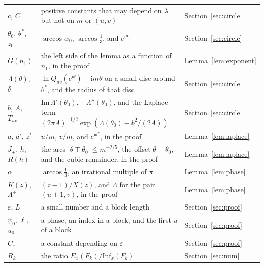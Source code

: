 \documentclass[11pt]{amsart}
\theoremstyle{remark}
\newcommand{\Inf}{\mathrm{Inf}}
\newcommand{\ii}{\mathrm{i}}
\begin{document}
\begin{longtable}{@{}>{\raggedright\arraybackslash}p{}>{\raggedright\arraybackslash}p{}>{\raggedright\arraybackslash}p{}@{}}
$c$, $C$ & positive constants that may depend on $\lambda$ but not on $m$ or $(u,v)$ & Section~\ref{sec:circle} \\
$\theta_0$, $\theta^*$, $z_0$ & $\arccos w_0$, $\arccos\frac13$, and $e^{\ii\theta_0}$ & Section~\ref{sec:circle} \\
$G(n_1)$ & the left side of the lemma as a function of $n_1$, in the proof & Lemma~\ref{lem:exponent} \\
$\Lambda(\theta)$, $\delta$ & $\ln Q_{uv}(e^{\ii\theta})-\ii m\theta$ on a small disc around $\theta^*$, and the radius of that disc & Section~\ref{sec:circle} \\
$b$, $A$, $T_{uv}$ & $\mathrm{Im}\,\Lambda'(\theta_0)$, $-\Lambda''(\theta_0)$, and the Laplace term $(2\pi A)^{-1/2}\exp(\Lambda(\theta_0)-b^2/(2A))$ & Section~\ref{sec:circle} \\
$a$, $a'$, $z^*$ & $u/m$, $v/m$, and $e^{\ii\theta^*}$, in the proof & Lemma~\ref{lem:laplace} \\
$J_\pm$, $h$, $R(h)$ & the arcs $|\theta\mp\theta_0|\le m^{-2/5}$, the offset $\theta-\theta_0$, and the cubic remainder, in the proof & Lemma~\ref{lem:laplace} \\
$\alpha$ & $\arccos\frac13$, an irrational multiple of $\pi$ & Lemma~\ref{lem:phase} \\
$K(z)$, $\Lambda^+$ & $(z-1)/X(z)$, and $\Lambda$ for the pair $(u+1,v)$, in the proof & Lemma~\ref{lem:phase} \\
$\varepsilon$, $L$ & a small number and a block length & Section~\ref{sec:proof} \\
$\psi_0$, $\ell$, $u_0$ & a phase, an index in a block, and the first $u$ of a block & Section~\ref{sec:proof} \\
$C_\varepsilon$ & a constant depending on $\varepsilon$ & Section~\ref{sec:proof} \\
$R_k$ & the ratio $E_x(F_k)/\Inf_x(F_k)$ & Section~\ref{sec:num} \\
\bottomrule
\end{longtable}
\end{document}
